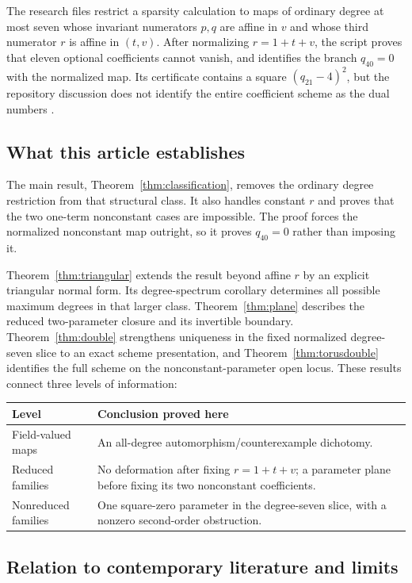 \documentclass[11pt,a4paper]{article}
\numberwithin{equation}{section}
\theoremstyle{definition}
\theoremstyle{remark}
\begin{document}
The research files restrict a sparsity calculation to maps of ordinary
degree at most seven whose invariant numerators $p,q$ are affine in $v$ and
whose third numerator $r$ is affine in $(t,v)$. After normalizing
$r=1+t+v$, the script proves that eleven optional coefficients cannot vanish,
and identifies the branch $q_{40}=0$ with the normalized map. Its certificate
contains a square $(q_{21}-4)^2$, but the repository discussion does not
identify the entire coefficient scheme as the dual numbers
\cite{repo-research,repo-sparsity}.

\subsection{What this article establishes}

The main result, Theorem~\ref{thm:classification}, removes the ordinary
degree restriction from that structural class. It also handles constant
$r$ and proves that the two one-term nonconstant cases are impossible. The
proof forces the normalized nonconstant map outright, so it proves
$q_{40}=0$ rather than imposing it.

Theorem~\ref{thm:triangular} extends the result beyond affine $r$ by an
explicit triangular normal form. Its degree-spectrum corollary determines
all possible maximum degrees in that larger class.
Theorem~\ref{thm:plane} describes the reduced two-parameter closure and its
invertible boundary. Theorem~\ref{thm:double} strengthens uniqueness in the
fixed normalized degree-seven slice to an exact scheme presentation, and Theorem~\ref{thm:torusdouble} identifies the full
scheme on the nonconstant-parameter open locus. These results connect
three levels of information:
\begin{center}
\begin{tabular}{@{}p{}p{}@{}}
\toprule
Level & Conclusion proved here\\
\midrule
Field-valued maps & An all-degree automorphism/counterexample dichotomy.\\
Reduced families & No deformation after fixing $r=1+t+v$; a parameter plane
before fixing its two nonconstant coefficients.\\
Nonreduced families & One square-zero parameter in the degree-seven slice,
with a nonzero second-order obstruction.\\
\bottomrule
\end{tabular}
\end{center}

\subsection{Relation to contemporary literature and limits}
\end{document}

